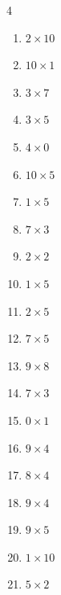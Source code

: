 \begin{multicols}{4}
\begin{enumerate}
  \item $2\times 10$
        \phantom{$=20$}

  \item $10\times 1$
        \phantom{$=10$}

  \item $3\times 7$
        \phantom{$=21$}

  \item $3\times 5$
        \phantom{$=15$}

  \item $4\times 0$
        \phantom{$=0$}

  \item $10\times 5$
        \phantom{$=50$}

  \item $1\times 5$
        \phantom{$=5$}

  \item $7\times 3$
        \phantom{$=21$}

  \item $2\times 2$
        \phantom{$=4$}

  \item $1\times 5$
        \phantom{$=5$}

  \item $2\times 5$
        \phantom{$=10$}

  \item $7\times 5$
        \phantom{$=35$}

  \item $9\times 8$
        \phantom{$=72$}

\columnbreak %

  \item $7\times 3$
        \phantom{$=21$}

  \item $0\times 1$
        \phantom{$=0$}

  \item $9\times 4$
        \phantom{$=36$}

  \item $8\times 4$
        \phantom{$=32$}

  \item $9\times 4$
        \phantom{$=36$}

  \item $9\times 5$
        \phantom{$=45$}

  \item $1\times 10$
        \phantom{$=10$}

  \item $5\times 2$
        \phantom{$=10$}


\end{enumerate}
\end{multicols}
